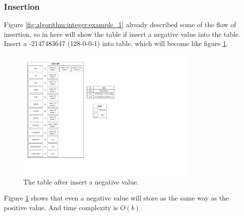 \subsubsection{Insertion}

Figure \ref{fig:algorithm:integer:example_1} already described some of the flow of insertion, so in here will show the table if insert a negative value into the table. Insert a -2147483647 (128-0-0-1) into table, which will become like figure \ref{fig:algorithm:integer:insertion:example_1}.

\begin{figure}[h]
\centering
\includegraphics[width=0.8\textwidth]{./algorithm/integer/pic/insertion/example_1_v3.pdf}
\caption{The table after insert a negative value.}
\label{fig:algorithm:integer:insertion:example_1}
\end{figure}

Figure \ref{fig:algorithm:integer:insertion:example_1} shows that even a negative value will store as the same way as the positive value. And time complexity is $O(b)$.


